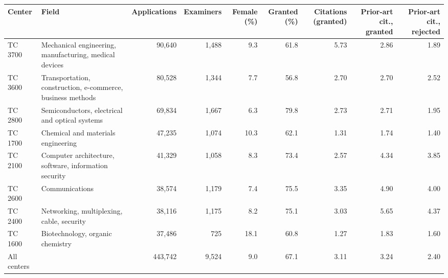 \begin{tabular}{llrrrrrrr}
\toprule
Center & Field & Applications & Examiners & Female (\%) & Granted (\%) & Citations (granted) & Prior-art cit., granted & Prior-art cit., rejected \\
\midrule
TC 3700 & Mechanical engineering, manufacturing, medical devices & 90,640 & 1,488 & 9.3 & 61.8 & 5.73 & 2.86 & 1.89 \\
TC 3600 & Transportation, construction, e-commerce, business methods & 80,528 & 1,344 & 7.7 & 56.8 & 2.70 & 2.70 & 2.52 \\
TC 2800 & Semiconductors, electrical and optical systems & 69,834 & 1,667 & 6.3 & 79.8 & 2.73 & 2.71 & 1.95 \\
TC 1700 & Chemical and materials engineering & 47,235 & 1,074 & 10.3 & 62.1 & 1.31 & 1.74 & 1.40 \\
TC 2100 & Computer architecture, software, information security & 41,329 & 1,058 & 8.3 & 73.4 & 2.57 & 4.34 & 3.85 \\
TC 2600 & Communications & 38,574 & 1,179 & 7.4 & 75.5 & 3.35 & 4.90 & 4.00 \\
TC 2400 & Networking, multiplexing, cable, security & 38,116 & 1,175 & 8.2 & 75.1 & 3.03 & 5.65 & 4.37 \\
TC 1600 & Biotechnology, organic chemistry & 37,486 & 725 & 18.1 & 60.8 & 1.27 & 1.83 & 1.60 \\
All centers &  & 443,742 & 9,524 & 9.0 & 67.1 & 3.11 & 3.24 & 2.40 \\
\bottomrule
\end{tabular}
